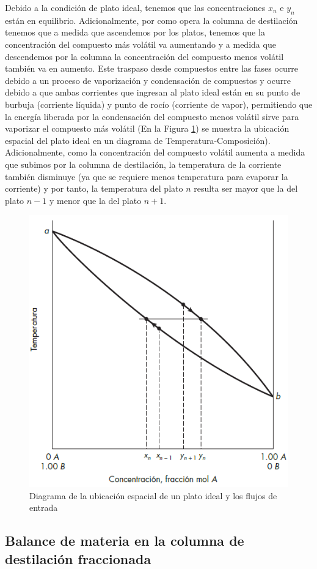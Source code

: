 \documentclass[11pt]{book}
\begin{document}
Debido a la condición de plato ideal, tenemos que las concentraciones $x_n$ e $y_n$ están en equilibrio. Adicionalmente, por como opera la columna de destilación tenemos que a medida que ascendemos por los platos, tenemos que la concentración del compuesto más volátil va aumentando y a medida que descendemos por la columna la concentración del compuesto menos volátil también va en aumento. Este traspaso desde compuestos entre las fases ocurre debido a un proceso de vaporización y condensación de compuestos y ocurre debido a que ambas corrientes que ingresan al plato ideal están en su punto de burbuja (corriente líquida) y punto de rocío (corriente de vapor), permitiendo que la energía liberada por la condensación del compuesto menos volátil sirve para vaporizar el compuesto más volátil (En la Figura \ref{fig:DiagramaTemperaturaComposicion}) se muestra la ubicación espacial del plato ideal en un diagrama de Temperatura-Composición). Adicionalmente, como la concentración del compuesto volátil aumenta a medida que subimos por la columna de destilación, la temperatura de la corriente también disminuye (ya que se requiere menos temperatura para evaporar la corriente) y por tanto, la temperatura del plato $n$ resulta ser mayor que la del plato $n - 1$ y menor que la del plato $n + 1$.

\begin{figure}
    \centering
    \includegraphics[width = 0.5\linewidth]{img/destilacion/DiagramaTemperaturaComposicion.PNG}
    \caption{Diagrama de la ubicación espacial de un plato ideal y los flujos de entrada}
    \label{fig:DiagramaTemperaturaComposicion}
\end{figure}

\subsection{Balance de materia en la columna de destilación fraccionada}
\end{document}
